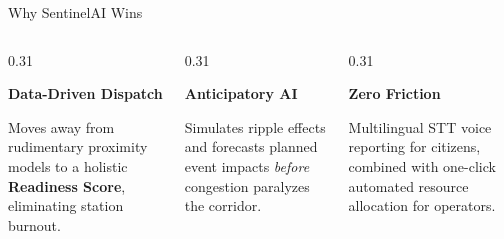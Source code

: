 \documentclass[aspectratio=169, xcolor=table]{beamer}
\begin{document}
\begin{frame}{Why SentinelAI Wins}
    \vspace{0.5cm}
    \begin{columns}[T]
        \begin{column}{0.31\textwidth}
            \begin{tcolorbox}[sentinelcard, height=4.5cm, halign=center]
                \textcolor{SentinelAccent}{\Large \textbf{Data-Driven Dispatch}}
                \vspace{0.3cm}
                
                \small
                Moves away from rudimentary proximity models to a holistic \textbf{Readiness Score}, eliminating station burnout.
            \end{tcolorbox}
        \end{column}
        \begin{column}{0.31\textwidth}
            \begin{tcolorbox}[sentinelcard, height=4.5cm, halign=center]
                \textcolor{SentinelAccent}{\Large \textbf{Anticipatory AI}}
                \vspace{0.3cm}
                
                \small
                Simulates ripple effects and forecasts planned event impacts \textit{before} congestion paralyzes the corridor.
            \end{tcolorbox}
        \end{column}
        \begin{column}{0.31\textwidth}
            \begin{tcolorbox}[sentinelcard, height=4.5cm, halign=center]
                \textcolor{SentinelAccent}{\Large \textbf{Zero Friction}}
                \vspace{0.3cm}
                
                \small
                Multilingual STT voice reporting for citizens, combined with one-click automated resource allocation for operators.
            \end{tcolorbox}
        \end{column}
    \end{columns}
\end{frame}
\end{document}
